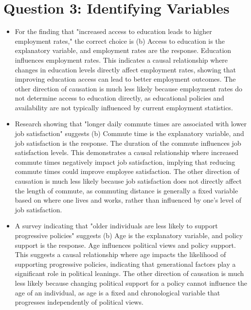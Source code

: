 \documentclass{article}
\begin{document}
\section*{Question 3: Identifying Variables}
\begin{itemize}
    \item For the finding that "increased access to education leads to higher employment rates," the correct choice is (b) Access to education is the explanatory variable, and employment rates are the response. Education influences employment rates. This indicates a causal relationship where changes in education levels directly affect employment rates, showing that improving education access can lead to better employment outcomes. The other direction of causation is much less likely because employment rates do not determine access to education directly, as educational policies and availability are not typically influenced by current employment statistics.
    \item Research showing that "longer daily commute times are associated with lower job satisfaction" suggests (b) Commute time is the explanatory variable, and job satisfaction is the response. The duration of the commute influences job satisfaction levels. This demonstrates a causal relationship where increased commute times negatively impact job satisfaction, implying that reducing commute times could improve employee satisfaction. The other direction of causation is much less likely because job satisfaction does not directly affect the length of commute, as commuting distance is generally a fixed variable based on where one lives and works, rather than influenced by one's level of job satisfaction.
    \item A survey indicating that "older individuals are less likely to support progressive policies" suggests (b) Age is the explanatory variable, and policy support is the response. Age influences political views and policy support. This suggests a causal relationship where age impacts the likelihood of supporting progressive policies, indicating that generational factors play a significant role in political leanings. The other direction of causation is much less likely because changing political support for a policy cannot influence the age of an individual, as age is a fixed and chronological variable that progresses independently of political views.

\end{itemize}
\end{document}

